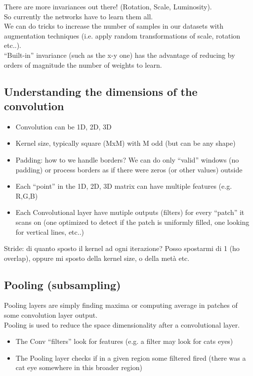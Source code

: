 There are more invariances out there! (Rotation, Scale, Luminosity).\\

So currently the networks have to learn them all.\\
We can do tricks to increase the number of samples in our datasets with augmentation techniques (i.e. apply random transformations of scale, rotation etc..).\\
“Built-in” invariance (such as the x-y one) has the advantage of reducing by orders of magnitude the number of weights to learn.

\subsection{Understanding the dimensions of the convolution}

\begin{itemize}
	\item Convolution can be 1D, 2D, 3D
	\item Kernel size, typically square (MxM) with M odd (but can be any shape)
	\item Padding: how to we handle borders? We can do only “valid” windows (no padding) or process borders as if there were zeros (or other values) outside
	\item Each “point” in the 1D, 2D, 3D matrix can have multiple features (e.g. R,G,B)
	\item Each Convolutional layer have mutiple outputs (filters) for every “patch” it scans on (one optimized to detect if the patch is uniformly filled, one looking for vertical lines, etc..)
\end{itemize}

Stride: di quanto sposto il kernel ad ogni iterazione? Posso spostarmi di 1 (ho overlap), oppure mi sposto della kernel size, o della metà etc.


\subsection{Pooling (subsampling)}

Pooling layers are simply finding maxima or computing average in patches of some convolution layer output.\\
Pooling is used to reduce the space dimensionality after a convolutional layer.
\begin{itemize}
	\item The Conv “filters” look for features (e.g. a filter may look for cats eyes)
	\item The Pooling layer checks if in a given 	region some filtered fired (there was a cat eye somewhere in this broader region)
\end{itemize}

